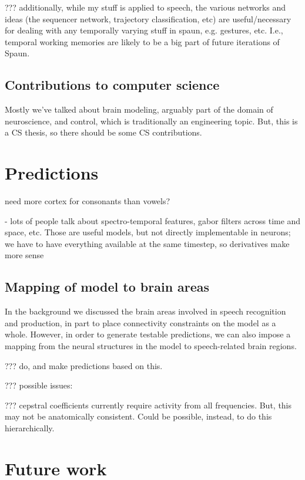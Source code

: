 ??? additionally, while my stuff is applied to speech,
the various networks and ideas (the sequencer network,
trajectory classification, etc) are useful/necessary
for dealing with any temporally varying stuff in spaun, e.g. gestures, etc.
I.e., temporal working memories are likely to be
a big part of future iterations of Spaun.

\subsection{Contributions to computer science}

Mostly we've talked about brain modeling,
arguably part of the domain of neuroscience,
and control, which is traditionally an engineering topic.
But, this is a CS thesis, so there should be some CS contributions.

\section{Predictions}

need more cortex for consonants than vowels?

- lots of people talk about spectro-temporal features,
  gabor filters across time and space, etc.
  Those are useful models, but not directly implementable
  in neurons; we have to have everything available at
  the same timestep, so derivatives make more sense

\subsection{Mapping of model to brain areas}

In the background we discussed the brain areas
involved in speech recognition and production,
in part to place connectivity constraints
on the model as a whole.
However, in order to generate testable predictions,
we can also impose a mapping from
the neural structures in the model
to speech-related brain regions.

??? do, and make predictions based on this.

??? possible issues:

??? cepstral coefficients currently require activity
from all frequencies. But, this may not be anatomically
consistent. Could be possible, instead, to do this
hierarchically.

\section{Future work}

